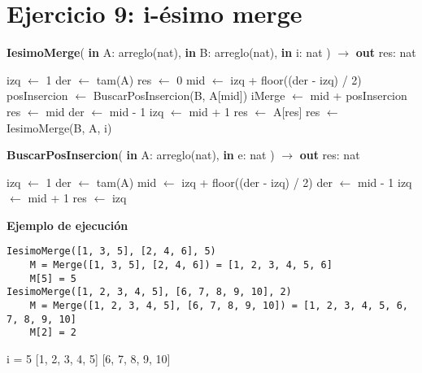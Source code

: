 \section{Ejercicio 9: i-ésimo merge}

\begin{algorithm}[H]
\caption{
    \textbf{IesimoMerge}(
        \textbf{in} A: arreglo(nat),
        \textbf{in} B: arreglo(nat),
        \textbf{in} i: nat
    ) $\to$ \textbf{out} res: nat
}
\begin{algorithmic}[1]
    \State izq $\gets$ 1
    \State der $\gets$ tam(A)
    \State res $\gets$ 0
        \State mid $\gets$ izq + floor((der - izq) / 2)
        \State posInsercion $\gets$ BuscarPosInsercion(B, A[mid])
        \State iMerge $\gets$ mid + posInsercion
            \State res $\gets$ mid
            \State der $\gets$ mid - 1
        \Else
            \State izq $\gets$ mid + 1
        \EndIf
    \EndWhile
        \State res $\gets$ A[res]
    \Else
        \State res $\gets$ IesimoMerge(B, A, i)
    \EndIf
\end{algorithmic}
\Complexity{}
\end{algorithm}

\begin{algorithm}[H]
    \caption{
        \textbf{BuscarPosInsercion}(
            \textbf{in} A: arreglo(nat),
            \textbf{in} e: nat
        ) $\to$ \textbf{out} res: nat
    }
\begin{algorithmic}[1]
    \State izq $\gets$ 1
    \State der $\gets$ tam(A)
        \State mid $\gets$ izq + floor((der - izq) / 2)
            \State der $\gets$ mid - 1
        \Else
            \State izq $\gets$ mid + 1
        \EndIf
    \EndWhile
    \State res $\gets$ izq
\end{algorithmic}
\Complexity{}
\end{algorithm}

\textbf{Ejemplo de ejecución}

\begin{lstlisting}
IesimoMerge([1, 3, 5], [2, 4, 6], 5)
    M = Merge([1, 3, 5], [2, 4, 6]) = [1, 2, 3, 4, 5, 6]
    M[5] = 5
IesimoMerge([1, 2, 3, 4, 5], [6, 7, 8, 9, 10], 2)
    M = Merge([1, 2, 3, 4, 5], [6, 7, 8, 9, 10]) = [1, 2, 3, 4, 5, 6, 7, 8, 9, 10]
    M[2] = 2
\end{lstlisting}

i = 5
[1, 2, 3, 4, 5]
[6, 7, 8, 9, 10]
